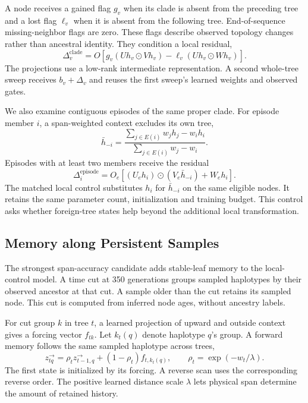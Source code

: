 \documentclass[letterpaper]{article}
\begin{document}
A node receives a gained flag $g_v$ when its clade is absent from the preceding tree and a lost flag $\ell_v$ when it is absent from the following tree. End-of-sequence missing-neighbor flags are zero. These flags describe observed topology changes rather than ancestral identity. They condition a local residual,
\begin{equation}
\Delta_v^{\mathrm{clade}}=
O\!\left[
g_v(Uh_v\odot Vh_v)
-\ell_v(Uh_v\odot Wh_v)
\right].
\label{eq:clade}
\end{equation}
The projections use a low-rank intermediate representation. A second whole-tree sweep receives $b_v+\Delta_v$ and reuses the first sweep's learned weights and observed gates.

We also examine contiguous episodes of the same proper clade. For episode member $i$, a span-weighted context excludes its own tree,
\begin{equation}
\bar h_{-i}=
\frac{\sum_{j\in E(i)}w_jh_j-w_ih_i}
     {\sum_{j\in E(i)}w_j-w_i}.
\label{eq:episode}
\end{equation}
Episodes with at least two members receive the residual
\begin{equation}
\Delta_i^{\mathrm{episode}}
 =O_e\!\left[(U_eh_i)\odot(V_e\bar h_{-i})+W_eh_i\right].
\end{equation}
The matched local control substitutes $h_i$ for $\bar h_{-i}$ on the same eligible nodes. It retains the same parameter count, initialization and training budget. This control asks whether foreign-tree states help beyond the additional local transformation.

\subsection{Memory along Persistent Samples}
The strongest span-accuracy candidate adds stable-leaf memory to the local-control model. A time cut at 350 generations groups sampled haplotypes by their observed ancestor at that cut. A sample older than the cut retains its sampled node. This cut is computed from inferred node ages, without ancestry labels.

For cut group $k$ in tree $t$, a learned projection of upward and outside context gives a forcing vector $f_{tk}$. Let $k_t(q)$ denote haplotype $q$'s group. A forward memory follows the same sampled haplotype across trees,
\begin{equation}
z^\rightarrow_{tq}
=\rho_t z^\rightarrow_{t-1,q}
 +(1-\rho_t)f_{t,k_t(q)},
\qquad
\rho_t=\exp(-w_t/\lambda).
\label{eq:memory}
\end{equation}
The first state is initialized by its forcing. A reverse scan uses the corresponding reverse order. The positive learned distance scale $\lambda$ lets physical span determine the amount of retained history.
\end{document}

